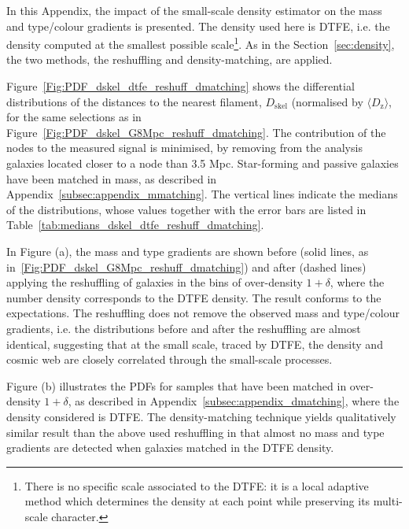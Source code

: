 \documentclass[useAMS,usenatbib]{mnras}
\begin{document}
In this Appendix, the impact of the small-scale density estimator on the mass and type/colour gradients is presented. The density used here is DTFE, i.e. the density computed at the smallest possible scale\footnote{There is no specific scale associated to the DTFE: it is a local adaptive method which determines the density at each point  while preserving its multi-scale character.}.  As in the Section~\ref{sec:density}, the two methods, the reshuffling and density-matching, are applied.

Figure~\ref{Fig:PDF_dskel_dtfe_reshuff_dmatching} shows the differential distributions of the distances to the nearest filament, $D_{\mathrm{skel}}$ (normalised by $\langle D_{\mathrm{z}} \rangle$, for the same selections as in Figure~\ref{Fig:PDF_dskel_G8Mpc_reshuff_dmatching}. 
The contribution of the nodes to the measured signal is minimised, by removing from the analysis galaxies located closer to a node than 3.5 Mpc. Star-forming and passive galaxies have been matched in mass, as described in Appendix~\ref{subsec:appendix_mmatching}. The vertical lines indicate the medians of the distributions, whose values together with the error bars are listed in Table~\ref{tab:medians_dskel_dtfe_reshuff_dmatching}. 

In Figure (a), the mass and type gradients are shown before (solid lines, as in~\ref{Fig:PDF_dskel_G8Mpc_reshuff_dmatching}) and after (dashed lines) applying the reshuffling of galaxies in the bins of over-density $1 + \delta$, where the number density corresponds to the DTFE density. 
The result conforms to the expectations. The reshuffling does not remove the observed mass and type/colour gradients, i.e. the distributions before and after the reshuffling are almost identical, suggesting that at the small scale, traced by DTFE, the density and cosmic web are closely correlated through the small-scale processes.   

Figure (b) illustrates the PDFs for samples that have been matched in over-density $1 + \delta$, as described in Appendix~\ref{subsec:appendix_dmatching}, where the density considered is DTFE. The density-matching technique yields qualitatively similar result than the above used reshuffling in that almost no mass and type gradients are detected when galaxies matched in the DTFE density.
\end{document}
